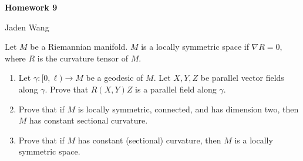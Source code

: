 \documentclass[12pt]{article}
\begin{document}
\centerline {\textsf{\textbf{\LARGE{Homework 9}}}}
\centerline {Jaden Wang}
\vspace{.15in}
\begin{problem}[4.6]
Let $ M$ be a Riemannian manifold.  $ M$ is a locally symmetric space if  $ \nabla R =0$, where $ R$ is the curvature tensor of  $ M$.
 \begin{enumerate}[label=(\alph*)]
	 \item Let $ \gamma:[0,\ell) \to M$ be a geodesic of $ M$. Let  $ X,Y,Z$ be parallel vector fields along  $ \gamma$. Prove that $ R(X,Y)Z$ is a parallel field along  $ \gamma$.
	 \item Prove that if $ M$ is locally symmetric, connected, and has dimension two, then  $ M$ has constant sectional curvature.
	 \item Prove that if $ M$ has constant (sectional) curvature, then  $ M$ is a locally symmetric space.
\end{enumerate}
\end{problem}
\end{document}
